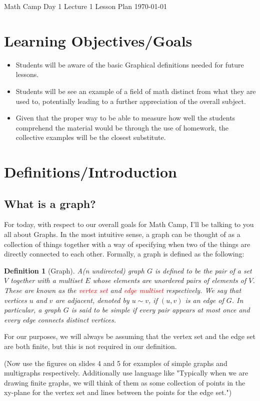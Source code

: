 \documentclass[12pt]{article}
\newtheorem{definition}[theorem]{Definition}
\begin{document}
	{ \hfill Math Camp Day 1 Lecture 1 Lesson Plan
\hfill
\today}
\section*{Learning Objectives/Goals}
\begin{itemize}
	\item Students will be aware of the basic Graphical definitions needed for future lessons.
	\item Students will be see an example of a field of math distinct from what they are used to, potentially leading to a further appreciation of the overall subject.
	\item Given that the proper way to be able to measure how well the students comprehend the material would be through the use of homework, the collective examples will be the closest substitute.
\end{itemize}
\section*{Definitions/Introduction}

\subsection*{What is a graph?}
\par 
For today, with respect to our overall goals for Math Camp, I'll be talking to you all about Graphs. In the most intuitive sense, a graph can be thought of as a collection of things together with a way of specifying when two of the things are directly connected to each other. Formally, a graph is defined as the following:
\begin{definition}[Graph]
	A(n undirected) graph $G$ is defined to be the pair of a set $V$ together with a multiset $E$ whose elements are unordered pairs of elements of $V$. These are known as the \textcolor{red}{vertex set} and \textcolor{red}{edge multiset} respectively. We say that vertices $u$ and $v$ are adjacent, denoted by $u\sim v$, if $(u,v)$ is an edge of $G$. In particular, a graph $G$ is said to be \emph{simple} if every pair appears at most once and every edge connects distinct vertices. 
\end{definition}
For our purposes, we will always be assuming that the vertex set and the edge set are both finite, but this is not required in our definition. 

(Now use the figures on slides 4 and 5 for examples of simple graphs and multigraphs respectively. Additionally use language like "Typically when we are drawing finite graphs, we will think of them as some collection of points in the xy-plane for the vertex set and lines between the points for the edge set.")
\end{document}
